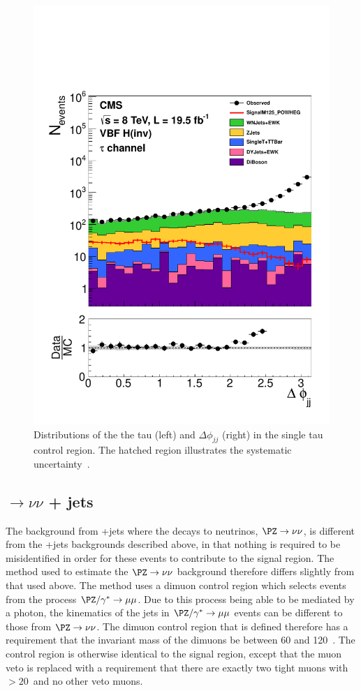 \begin{figure}
  \includegraphics[width=.6\largefigwidth]{plots/prompt/AN-12-403-figs/hWTau_dPhiJJ.pdf}
  \caption{Distributions of the the tau \pt (left) and $\Delta\phi_{jj}$ (right) in the single tau control region. The hatched region illustrates the systematic uncertainty~\cite{ARTICLE:CMSAN-12-403}.}
  \label{fig:promptwtaunu}
\end{figure}

\subsection{\PZ$\rightarrow \nu\nu$ + jets}
\label{sec:promptznunu}
The background from \PZ+jets where the \PZ decays to neutrinos, $\PZ\rightarrow\nu\nu$, is different from the \PW+jets backgrounds described above, in that nothing is required to be misidentified in order for these events to contribute to the signal region. The method used to estimate the $\PZ\rightarrow\nu\nu$ background therefore differs slightly from that used above. The method uses a dimuon control region which selects events from the process $\PZ/\gamma^{*}\rightarrow\mu\mu$. Due to this process being able to be mediated by a photon, the kinematics of the jets in $\PZ/\gamma^{*}\rightarrow\mu\mu$ events can be different to those from $\PZ\rightarrow\nu\nu$. The dimuon control region that is defined therefore has a requirement that the invariant mass of the dimuons be between 60 and 120 \GeV\,. The control region is otherwise identical to the signal region, except that the muon veto is replaced with a requirement that there are exactly two tight muons with \pt$>20$\GeV\, and no other veto muons.

